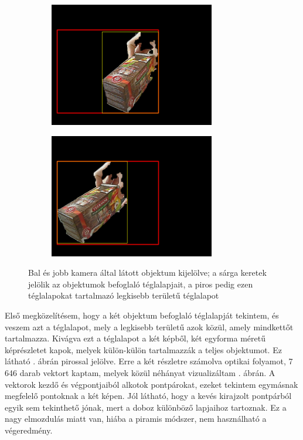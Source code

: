 \begin{figure}[tbh]
\centering
\begin{subfigure}[b]{.49\linewidth}
	\centering
	\includegraphics[width=205pt]{figures/of_img_left_framed.png}
  \end{subfigure}
\begin{subfigure}[b]{.49\linewidth}
	\centering
	\includegraphics[width=205pt]{figures/of_img_right_framed.png}
  \end{subfigure}
\caption{Bal és jobb kamera által látott objektum kijelölve; a sárga keretek jelölik az objektumok befoglaló téglalapjait, a piros pedig ezen téglalapokat tartalmazó legkisebb területű téglalapot \label{fig:of_original}}
\end{figure}

Első megközelítésem, hogy a két objektum befoglaló téglalapját tekintem, és veszem azt a téglalapot, mely a legkisebb területű azok közül, amely mindkettőt tartalmazza. Kivágva ezt a téglalapot a két képből, két egyforma méretű képrészletet kapok, melyek külön-külön tartalmazzák a teljes objektumot. Ez látható . ábrán pirossal jelölve. Erre a két részletre számolva optikai folyamot, 7 646 darab vektort kaptam, melyek közül néhányat vizualizáltam . ábrán. A vektorok kezdő és végpontjaiból alkotok pontpárokat, ezeket tekintem egymásnak megfelelő pontoknak a két képen. Jól látható, hogy a kevés kirajzolt pontpárból egyik sem tekinthető jónak, mert a doboz különböző lapjaihoz tartoznak. Ez a nagy elmozdulás miatt van, hiába a piramis módszer, nem használható a végeredmény.

